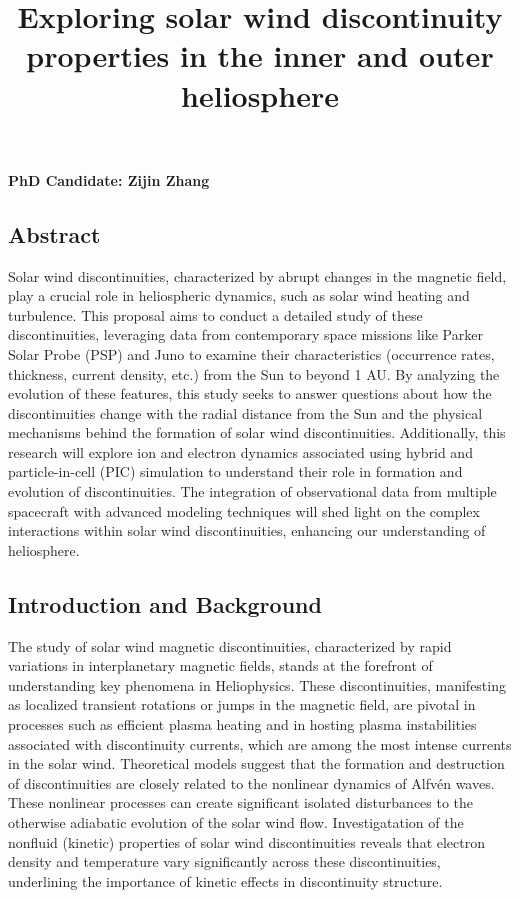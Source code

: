 \documentclass[
  letterpaper,
  DIV=11,
  numbers=noendperiod]{scrartcl}
\title{Exploring solar wind discontinuity properties in the inner and outer heliosphere}
\author{}
\date{}
\begin{document}
\maketitle

\vspace{-20truemm}

\textbf{PhD Candidate: Zijin Zhang}

\subsection{Abstract}\label{abstract}

Solar wind discontinuities, characterized by abrupt changes in the magnetic field, play a crucial role in heliospheric dynamics, such as solar wind heating and turbulence. This proposal aims to conduct a detailed study of these discontinuities, leveraging data from contemporary space missions like Parker Solar Probe (PSP) and Juno to examine their characteristics (occurrence rates, thickness, current density, etc.) from the Sun to beyond 1 AU. By analyzing the evolution of these features, this study seeks to answer questions about how the discontinuities change with the radial distance from the Sun and the physical mechanisms behind the formation of solar wind discontinuities. Additionally, this research will explore ion and electron dynamics associated using hybrid and particle-in-cell (PIC) simulation to understand their role in formation and evolution of discontinuities. The integration of observational data from multiple spacecraft with advanced modeling techniques will shed light on the complex interactions within solar wind discontinuities, enhancing our understanding of heliosphere.

\subsection{Introduction and Background}\label{introduction-and-background}

The study of solar wind magnetic discontinuities, characterized by rapid variations in interplanetary magnetic fields, stands at the forefront of understanding key phenomena in Heliophysics. These discontinuities, manifesting as localized transient rotations or jumps in the magnetic field, are pivotal in processes such as efficient plasma heating and in hosting plasma instabilities associated with discontinuity currents, which are among the most intense currents in the solar wind. Theoretical models suggest that the formation and destruction of discontinuities are closely related to the nonlinear dynamics of Alfvén waves. These nonlinear processes can create significant isolated disturbances to the otherwise adiabatic evolution of the solar wind flow. Investigatation of the nonfluid (kinetic) properties of solar wind discontinuities reveals that electron density and temperature vary significantly across these discontinuities, underlining the importance of kinetic effects in discontinuity structure.
\end{document}
